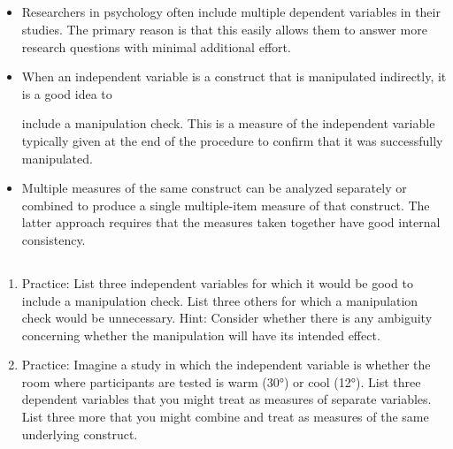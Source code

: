 \subsection{}
\begin{fullwidth}
\begin{itemize}

\item Researchers in psychology often include multiple dependent variables in their studies. The primary reason is that this easily allows them to answer more research questions with minimal additional effort.
\item  When an independent variable is a construct that is manipulated indirectly, it is a good idea to
  
include a manipulation check. This is a measure of the independent variable typically given at the
end of the procedure to confirm that it was successfully manipulated.
\item  Multiple measures of the same construct can be analyzed separately or combined to produce a
single multiple-item measure of that construct. The latter approach requires that the measures taken together have good internal consistency.


\end{itemize}
\end{fullwidth}


\subsection{}
\begin{fullwidth}
\begin{enumerate}
\item  Practice: List three independent variables for which it would be good to include a manipulation check. List three others for which a manipulation check would be unnecessary. Hint: Consider whether there is any ambiguity concerning whether the manipulation will have its intended effect. 
\item Practice: Imagine a study in which the independent variable is whether the room where participants are tested is warm (30°) or cool (12°). List three dependent variables that you might treat as measures of separate variables. List three more that you might combine and treat as measures of the same underlying construct.
\end{enumerate}
\end{fullwidth}  

\newpage
